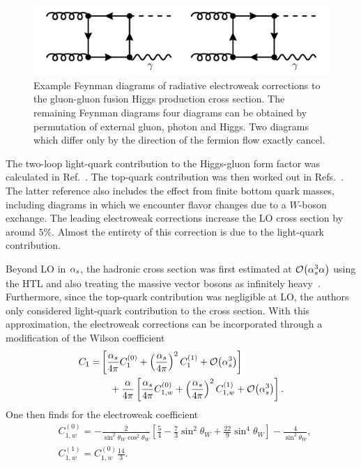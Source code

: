 \begin{figure}[h]
  \centering
  \includegraphics[scale=0.25]{Images/electro_weak_real.pdf}
  \caption{Example Feynman diagrams of radiative electroweak corrections to the gluon-gluon fusion Higgs production cross section. The remaining Feynman diagrams four diagrams can be obtained by permutation of external gluon, photon and Higgs. Two diagrams which differ only by the direction of the fermion flow exactly cancel.}
  \label{fig:4:ew_real}
\end{figure}

The two-loop light-quark contribution to the Higgs-gluon form factor was calculated in Ref.~\cite{Aglietti:2004nj}. The top-quark contribution was then worked out in Refs.~\cite{Degrassi:2004mx, Actis:2008ts, Actis:2008ug}. The latter reference also includes the effect from finite bottom quark masses, including diagrams in which we encounter flavor changes due to a $W$-boson exchange. The leading electroweak corrections increase the \acs{LO} cross section by around $5\%$. Almost the entirety of this correction is due to the light-quark contribution.

Beyond \acs{LO} in $\alpha_s$, the hadronic cross section was first estimated at $\mathcal{O}\!\left(\alpha_s^3 \alpha\right)$ using the \acs{HTL} and also treating the massive vector bosons as infinitely heavy~\cite{Anastasiou:2008tj}. Furthermore, since the top-quark contribution was negligible at \acs{LO}, the authors only considered light-quark contribution to the cross section. With this approximation, the electroweak corrections can be incorporated through a modification of the Wilson coefficient
\begin{equation}
\begin{split}
  C_1 = &\left[\frac{\alpha_s}{4 \pi} C_1^{(0)} + \left(\frac{\alpha_s}{4 \pi} \right)^2  C_1^{(1)} + \mathcal{O}\!\left(\alpha_s^3\right) \right] \\
  & \quad + \frac{\alpha}{4 \pi} \left[ \frac{\alpha_s}{4 \pi} C_{1,w}^{(0)} +  \left(\frac{\alpha_s}{4 \pi} \right)^2  C_{1,w}^{(1)} + \mathcal{O}\!\left(\alpha_s^3\right) \right].
\end{split}
\label{eq:4:ew_Wilson}
\end{equation}
One then finds for the electroweak coefficient
\begin{equation}
  \begin{split}
  &C_{1,w}^{(0)} = -  \frac{2}{\sin^2 \theta_W \cos^2 \theta_W} \left[ \frac{5}{4} - \frac{7}{3} \sin^2 \theta_W + \frac{22}{9} \sin^4 \theta_W \right] - \frac{4}{\sin^2 \theta_W}, \\
  &C_{1,w}^{(1)} = C_{1,w}^{(0)} \frac{14}{3}.
  \end{split}
\end{equation}

